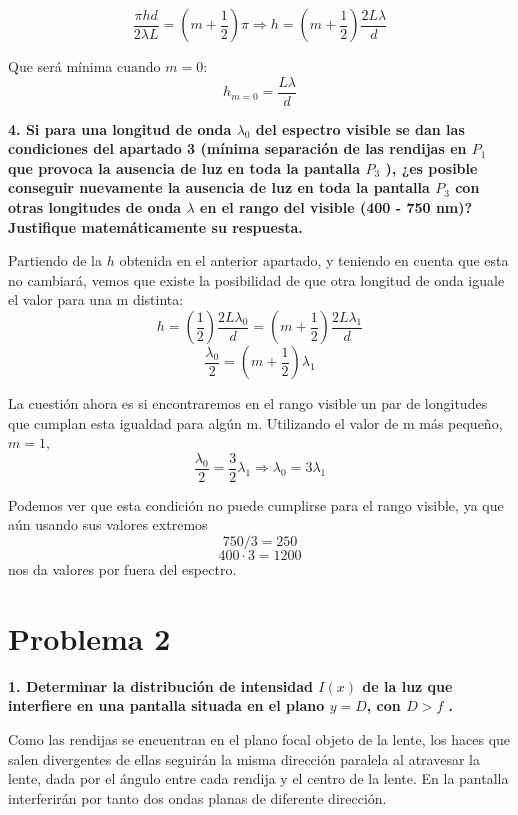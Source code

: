 \documentclass[a4paper,12pt,spanish]{article}
\begin{document}
\[ \frac{\pi hd}{2\lambda L} = (m + \frac{1}{2})\pi \Longrightarrow h = (m + \frac{1}{2}) \frac{2L \lambda}{d}
\]

Que será mínima cuando $m = 0$:
\[ \boxed{h_{m=0} = \frac{L \lambda}{d} }
\]

\vspace{\baselineskip}
\vspace{\baselineskip}

\textbf{ 4. Si para una longitud de onda $\lambda_0$ del espectro visible se dan las condiciones
	del apartado 3 (mínima separación de las rendijas en $P_1$ que provoca la ausencia de luz en toda la pantalla $P_3$  ), ¿es posible conseguir nuevamente
	la ausencia de luz en toda la pantalla $P_3$ con otras longitudes de onda
	$\lambda$ en el rango del visible (400 - 750 nm)? Justifique matemáticamente su
	respuesta.
}
\vspace{\baselineskip}

Partiendo de la $h$ obtenida en el anterior apartado, y teniendo en cuenta que esta no cambiará, vemos que existe la posibilidad de que otra longitud de onda iguale el valor para una m distinta:
\[ h = ( \frac{1}{2}) \frac{2L \lambda_0}{d} = (m + \frac{1}{2}) \frac{2L \lambda_1}{d}
\]
\[ \frac{\lambda_0}{2} = (m + \frac{1}{2}) \lambda_1
\]

La cuestión ahora es si encontraremos en el rango visible un par de longitudes que cumplan esta igualdad para algún m.
Utilizando el valor de m más pequeño, $m=1$,
\[ \frac{\lambda_0}{2} =  \frac{3}{2} \lambda_1 \Longrightarrow \lambda_0 = 3\lambda_1
\]

Podemos ver que esta condición no puede cumplirse para el rango visible, ya que aún usando sus valores extremos
\[ 750/3 = 250
\]
\[400 \cdot 3 = 1200\]
nos da valores por fuera del espectro.



\section*{Problema 2}
\textbf{ 1. Determinar la distribución de intensidad $I(x)$ de la luz que interfiere en
	una pantalla situada en el plano $y = D$, con $D > f$ .
}
\vspace{\baselineskip}

Como las rendijas se encuentran en el plano focal objeto de la lente, los haces que salen divergentes de ellas seguirán la misma dirección paralela al atravesar la lente, dada por el ángulo entre cada rendija y el centro de la lente. En la pantalla interferirán por tanto dos ondas planas de diferente dirección. 
\end{document}
